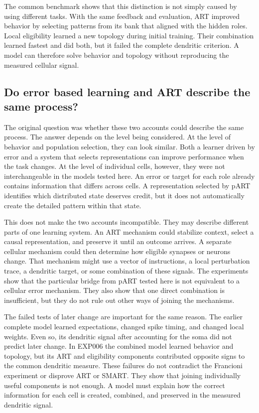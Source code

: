 \documentclass[11pt]{article}
\begin{document}
The common benchmark shows that this distinction is not simply caused by using different tasks. With the same feedback and evaluation, ART improved behavior by selecting patterns from its bank that aligned with the hidden roles. Local eligibility learned a new topology during initial training. Their combination learned fastest and did both, but it failed the complete dendritic criterion. A model can therefore solve behavior and topology without reproducing the measured cellular signal.

\subsection{Do error based learning and ART describe the same process?}
The original question was whether these two accounts could describe the same process. The answer depends on the level being considered. At the level of behavior and population selection, they can look similar. Both a learner driven by error and a system that selects representations can improve performance when the task changes. At the level of individual cells, however, they were not interchangeable in the models tested here. An error or target for each role already contains information that differs across cells. A representation selected by pART identifies which distributed state deserves credit, but it does not automatically create the detailed pattern within that state.

This does not make the two accounts incompatible. They may describe different parts of one learning system. An ART mechanism could stabilize context, select a causal representation, and preserve it until an outcome arrives. A separate cellular mechanism could then determine how eligible synapses or neurons change. That mechanism might use a vector of instructions, a local perturbation trace, a dendritic target, or some combination of these signals. The experiments show that the particular bridge from pART tested here is not equivalent to a cellular error mechanism. They also show that one direct combination is insufficient, but they do not rule out other ways of joining the mechanisms.

The failed tests of later change are important for the same reason. The earlier complete model learned expectations, changed spike timing, and changed local weights. Even so, its dendritic signal after accounting for the soma did not predict later change. In EXP006 the combined model learned behavior and topology, but its ART and eligibility components contributed opposite signs to the common dendritic measure. These failures do not contradict the Francioni experiment or disprove ART or SMART. They show that joining individually useful components is not enough. A model must explain how the correct information for each cell is created, combined, and preserved in the measured dendritic signal.
\end{document}
